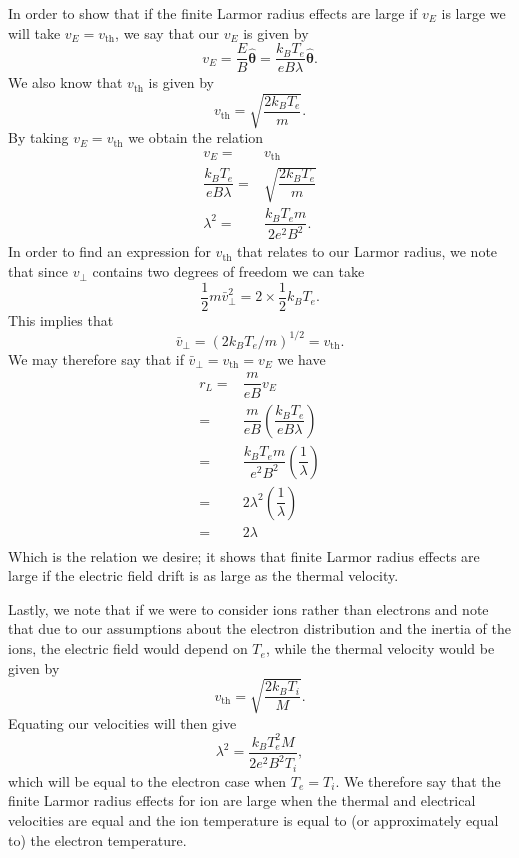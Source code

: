 In order to show that if the finite Larmor radius effects are large if \(v_E\) is large we will take \(v_E = v_\text{th} \), we say that our \(v_E\) is given by
\begin{equation}
	v_E = \dfrac{E}{B}\hat{\bm{\theta}} = \dfrac{k_BT_e}{eB\lambda}\hat{\bm{\theta}}.
\end{equation}
We also know that \(v_\text{th} \) is given by 
\begin{equation}
	v_\text{th} = \sqrt{\dfrac{2k_BT_e}{m}}.
\end{equation}
By taking \(v_E = v_\text{th} \) we obtain the relation
\begin{align}
	v_E =& v_\text{th}\\
	\dfrac{k_BT_e}{eB\lambda} =& \sqrt{\dfrac{2k_BT_e}{m}}\\
	\lambda^2 =& \dfrac{k_BT_em}{2e^2B^2}.
\end{align}
In order to find an expression for \(v_\text{th}\) that relates to our Larmor radius, we note that since \(v_\perp\) contains two degrees of freedom we can take
\begin{equation}
	\dfrac{1}{2}m\bar{v}_\perp^2 = 2\times\dfrac{1}{2}k_BT_e.
\end{equation}
This implies that 
\begin{equation}
	\bar{v}_\perp = \left(2k_BT_e/m\right)^{1/2} = v_\text{th}.
\end{equation}
We may therefore say that if \(\bar{v}_\perp = v_\text{th} = v_E \) we have
\begin{align}
	r_L =& \dfrac{m}{eB} v_E \\
	=& \dfrac{m}{eB} \left(\dfrac{k_BT_e}{eB\lambda}\right) \\
	=& \dfrac{k_BT_em}{e^2B^2} \left(\dfrac{1}{\lambda}\right) \\
	=& 2\lambda^2 \left(\dfrac{1}{\lambda}\right) \\
	=& 2\lambda \\
\end{align}
Which is the relation we desire; it shows that finite Larmor radius effects are large if the electric field drift is as large as the thermal velocity.

Lastly, we note that if we were to consider ions rather than electrons and note that due to our assumptions about the electron distribution and the inertia of the ions, the electric field would depend on \(T_e\), while the thermal velocity would be given by
\begin{equation}
	v_\text{th} = \sqrt{\dfrac{2k_BT_i}{M}}.
\end{equation}
Equating our velocities will then give
\begin{equation}
	\lambda^2 = \dfrac{k_BT_e^2M}{2e^2B^2T_i},
\end{equation}
which will be equal to the electron case when \(T_e = T_i\). We therefore say that the finite Larmor radius effects for ion are large when the thermal and electrical velocities are equal and the ion temperature is equal to (or approximately equal to) the electron temperature.


